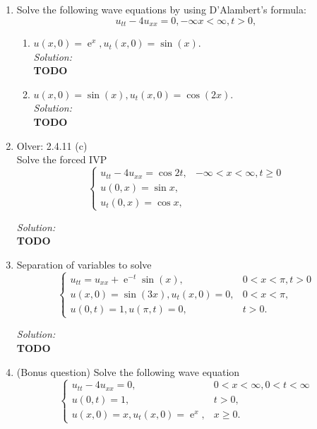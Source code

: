 \documentclass[10pt]{amsart}
\DeclareMathOperator{\E}{e}
\theoremstyle{nonumberplain}
\begin{document}
\begin{enumerate}[label={\bf {\arabic*}:}]

\item Solve the following wave equations by using D'Alambert's formula:
$$u_{tt} - 4u_{xx} = 0, -\infty x < \infty, t > 0,$$
\begin{enumerate}
\item $u(x, 0) = \E^x, u_t(x, 0) = \sin(x)$. \\

\noindent
\textit{Solution:} \\
\textbf{TODO}


\item $u(x, 0) = \sin(x), u_t(x, 0) = \cos(2x)$. \\

\noindent
\textit{Solution:} \\
\textbf{TODO}

\newpage

\end{enumerate}

\newpage


\item Olver: 2.4.11 (c) \\
Solve the forced IVP
$$
\begin{cases}
u_{tt} - 4 u_{xx} = \cos 2t, &-\infty < x < \infty, t \geq 0\\
u(0, x) = \sin x, \\
u_t(0, x) = \cos x,
\end{cases}
$$

\noindent
\textit{Solution:} \\
\textbf{TODO}


\newpage


\item Separation of variables to solve
$$
\begin{cases}
u_{tt} = u_{xx} + \E^{-t}\sin(x), & 0 < x < \pi, t > 0 \\
u(x, 0) = \sin(3x), u_t(x, 0) = 0, & 0 < x < \pi, \\
u(0, t) = 1, u(\pi, t) = 0, & t > 0.
\end{cases}
$$

\noindent
\textit{Solution:} \\
\textbf{TODO}

\newpage

\item (Bonus question) Solve the following wave equation
$$
\begin{cases}
u_{tt} - 4 u_{xx} = 0, & 0 < x < \infty, 0 < t < \infty \\
u(0, t) = 1, & t > 0, \\
u(x, 0) = x, u_t(x, 0) = \E^x, & x \geq 0.
\end{cases}
$$


\end{enumerate}
\end{document}
